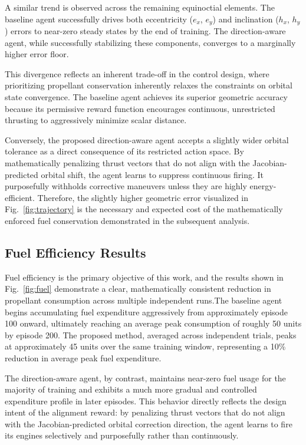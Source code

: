 \documentclass[paper]{ieice}
\begin{document}
A similar trend is observed across the remaining equinoctial elements. The baseline agent successfully drives both eccentricity ($e_x$, $e_y$) and inclination ($h_x$, $h_y$) errors to near-zero steady states by the end of training. The direction-aware agent, while successfully stabilizing these components, converges to a marginally higher error floor. 

This divergence reflects an inherent trade-off in the control design, where prioritizing propellant conservation inherently relaxes the constraints on orbital state convergence. The baseline agent achieves its superior geometric accuracy because its permissive reward function encourages continuous, unrestricted thrusting to aggressively minimize scalar distance. 

Conversely, the proposed direction-aware agent accepts a slightly wider orbital tolerance as a direct consequence of its restricted action space. By mathematically penalizing thrust vectors that do not align with the Jacobian-predicted orbital shift, the agent learns to suppress continuous firing. It purposefully withholds corrective maneuvers unless they are highly energy-efficient. Therefore, the slightly higher geometric error visualized in Fig.~\ref{fig:trajectory} is the necessary and expected cost of the mathematically enforced fuel conservation demonstrated in the subsequent analysis.

\subsection{Fuel Efficiency Results}

Fuel efficiency is the primary objective of this work, and the results shown in Fig.~\ref{fig:fuel} demonstrate a clear, mathematically consistent reduction in propellant consumption across multiple independent runs.The baseline agent begins accumulating fuel expenditure aggressively from approximately episode 100 onward, ultimately reaching an average peak consumption of roughly 50 units by episode 200. The proposed method, averaged across independent trials, peaks at approximately 45 units over the same training window, representing a 10\% reduction in average peak fuel expenditure.

The direction-aware agent, by contrast, maintains near-zero fuel usage for the majority of training and exhibits a much more gradual and controlled expenditure profile in later episodes. This behavior directly reflects the design intent of the alignment reward: by penalizing thrust vectors that do not align with the Jacobian-predicted orbital correction direction, the agent learns to fire its engines selectively and purposefully rather than continuously.
\end{document}
